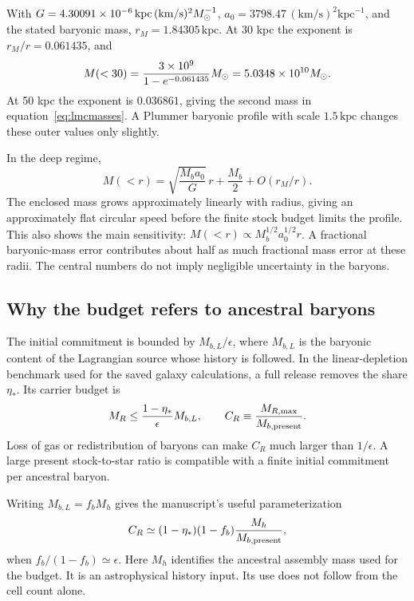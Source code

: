 With $G=4.30091\times10^{-6}\,\mathrm{kpc}\,(\mathrm{km/s})^2M_\odot^{-1}$,
$a_0=3798.47\,(\mathrm{km/s})^2\mathrm{kpc}^{-1}$, and the stated baryonic
mass, $r_M=1.84305\,\mathrm{kpc}$. At 30 kpc the exponent is
$r_M/r=0.061435$, and
\begin{equation}
M(<30)=\frac{3\times10^9}{1-e^{-0.061435}}M_\odot
=5.0348\times10^{10}M_\odot.
\end{equation}
At 50 kpc the exponent is $0.036861$, giving the second mass in
equation~\eqref{eq:lmcmasses}. A Plummer baryonic profile with scale
$1.5\,\mathrm{kpc}$ changes these outer values only slightly.

In the deep regime,
\begin{equation}
M(<r)=\sqrt{\frac{M_ba_0}{G}}\,r+\frac{M_b}{2}
+O(r_M/r).
\end{equation}
The enclosed mass grows approximately linearly with radius, giving an
approximately flat circular speed before the finite stock budget limits
the profile. This also shows the main sensitivity:
$M(<r)\propto M_b^{1/2}a_0^{1/2}r$. A fractional baryonic-mass error
contributes about half as much fractional mass error at these radii.
The central numbers do not imply negligible uncertainty in the baryons.

\subsection{Why the budget refers to ancestral baryons}

The initial commitment is bounded by $M_{b,L}/\epsilon$, where $M_{b,L}$
is the baryonic content of the Lagrangian source whose history is followed.
In the linear-depletion benchmark used for the saved galaxy calculations,
a full release removes the share $\eta_*$. Its carrier budget is
\begin{equation}
M_R\le \frac{1-\eta_*}{\epsilon}M_{b,L},\qquad
C_R\equiv\frac{M_{R,\max}}{M_{b,\rm present}}.
\label{eq:cap}
\end{equation}
Loss of gas or redistribution of baryons can make $C_R$ much larger than
$1/\epsilon$. A large present stock-to-star ratio is compatible with a
finite initial commitment per ancestral baryon.

Writing $M_{b,L}=f_bM_h$ gives the manuscript's useful parameterization
\begin{equation}
C_R\simeq(1-\eta_*)(1-f_b)\frac{M_h}{M_{b,\rm present}},
\end{equation}
when $f_b/(1-f_b)\simeq\epsilon$. Here $M_h$ identifies the ancestral
assembly mass used for the budget. It is an astrophysical history input.
Its use does not follow from the cell count alone.

